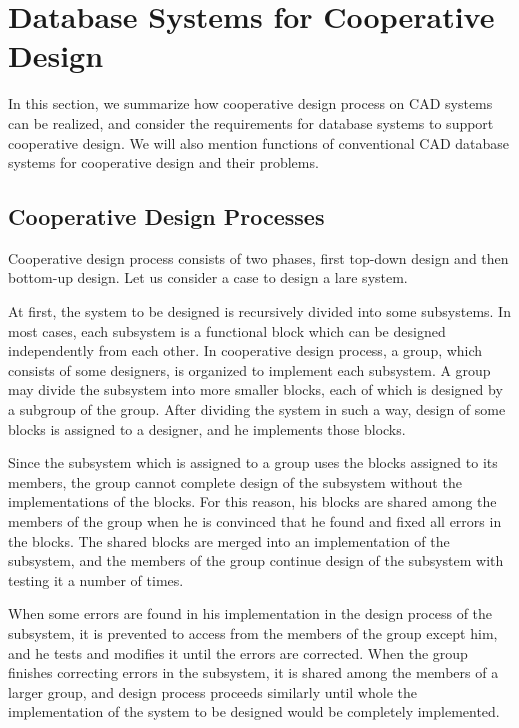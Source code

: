 \section{Database Systems for Cooperative Design}
\label{sec:cooperativedb}
In this section, we summarize how cooperative design
process on CAD systems can be realized, and consider the requirements for 
database systems to support cooperative design.
We will also mention functions of conventional CAD database systems 
for cooperative design and their problems.

\subsection{Cooperative Design Processes}
\label{subsec:coop-process}
Cooperative design process consists of two phases, first top-down design
and then bottom-up design.
Let us consider a case to design a lare system.

At first, the system to be designed is recursively divided into
some subsystems.
In most cases, each subsystem is a functional block which can be 
designed independently from each other.
In cooperative design process, a group, which consists of some 
designers, is organized to implement each subsystem.
A group may divide the subsystem into more smaller blocks, each of which
is designed by a subgroup of the group.
After dividing the system in such a way, design of some blocks is
assigned to a designer, and he implements those blocks.

Since the subsystem which is assigned to a group uses the blocks
assigned to its members, the group cannot complete design of the
subsystem without the implementations of the blocks.
For this reason, his blocks are shared among the members of the group  
when he is convinced that he found and fixed all errors in the blocks.
The shared blocks are merged into an implementation of the subsystem,
and the members of the group continue design of the subsystem with
testing it a number of times.

When some errors are found in his implementation in the design process
of the subsystem,
it is prevented to access from the members of the group 
except him, and he tests and modifies it until the errors are
corrected.
When the group finishes correcting errors in the subsystem, 
it is shared among the members of a larger group, and design 
process proceeds similarly until whole the implementation of the system to
be designed would be completely implemented.

